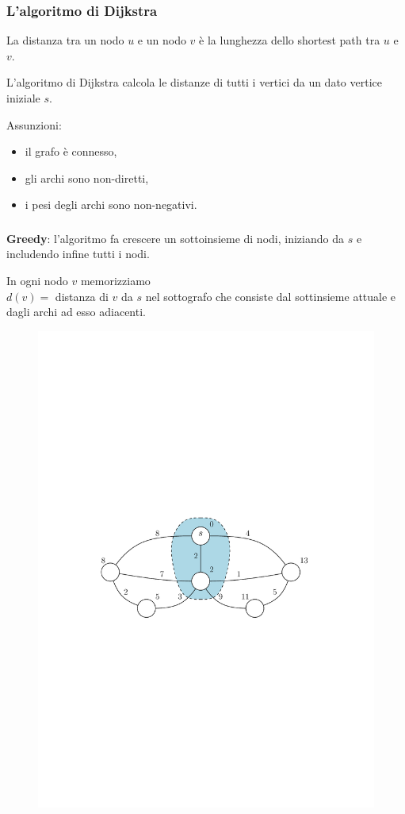 \documentclass[10pt,xcolor=dvipsnames]{beamer}
\begin{document}
\begin{frame}
	\frametitle{L'algoritmo di Dijkstra}
	La distanza tra un nodo $u$ e un nodo $v$ è la lunghezza dello shortest path
	tra $u$ e $v$.
	\vfill

	L'algoritmo di Dijkstra calcola le distanze di tutti i vertici da un dato vertice iniziale $s$.
	\vfill

	\pause
	Assunzioni:
	\begin{itemize}
		\item il grafo è connesso,
		\item gli archi sono non-diretti,
		\item i pesi degli archi sono non-negativi.
	\end{itemize}
\end{frame}

\begin{frame}
	\frametitle{}
	\textbf{Greedy}: l'algoritmo fa crescere un sottoinsieme di nodi, 
	iniziando da $s$ e includendo infine tutti i nodi.
	\vfill

	In ogni nodo $v$ memorizziamo\\
	$d(v)=$ distanza di $v$ da $s$ nel sottografo che consiste dal sottinsieme attuale
	e dagli archi ad esso adiacenti.	
	
	\begin{figure}[h]
	\centering
		\includegraphics[scale=0.8]{dijkstra_example.pdf}
	\end{figure}
\end{frame}
\end{document}
